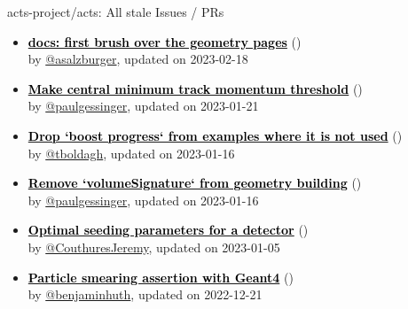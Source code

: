 \begin{frame}[allowframebreaks]{ acts-project/acts: All stale Issues / PRs}
\begin{itemize}
    \item\propen\prwip\prstale\textbf{\href{https://github.com/acts-project/acts/pull/1395}{\textcolor{black}{docs: first brush over the geometry pages}}}
    (\href{https://github.com/acts-project/acts/pull/1395}{}) \\
    by \href{https://github.com/asalzburger}{@asalzburger}, updated on 2023-02-18

    \item\iss\prstale\textbf{\href{https://github.com/acts-project/acts/issues/1761}{\textcolor{black}{Make central minimum track momentum threshold}}}
    (\href{https://github.com/acts-project/acts/issues/1761}{}) \\
    by \href{https://github.com/paulgessinger}{@paulgessinger}, updated on 2023-01-21

    \item\iss\prstale\textbf{\href{https://github.com/acts-project/acts/issues/1736}{\textcolor{black}{Drop `boost progress` from examples where it is not used}}}
    (\href{https://github.com/acts-project/acts/issues/1736}{}) \\
    by \href{https://github.com/tboldagh}{@tboldagh}, updated on 2023-01-16

    \item\iss\prstale\textbf{\href{https://github.com/acts-project/acts/issues/1731}{\textcolor{black}{Remove `volumeSignature` from geometry building}}}
    (\href{https://github.com/acts-project/acts/issues/1731}{}) \\
    by \href{https://github.com/paulgessinger}{@paulgessinger}, updated on 2023-01-16

    \item\iss\prstale\textbf{\href{https://github.com/acts-project/acts/issues/1699}{\textcolor{black}{Optimal seeding parameters for a detector}}}
    (\href{https://github.com/acts-project/acts/issues/1699}{}) \\
    by \href{https://github.com/CouthuresJeremy}{@CouthuresJeremy}, updated on 2023-01-05

    \item\iss\prstale\textbf{\href{https://github.com/acts-project/acts/issues/1603}{\textcolor{black}{Particle smearing assertion with Geant4}}}
    (\href{https://github.com/acts-project/acts/issues/1603}{}) \\
    by \href{https://github.com/benjaminhuth}{@benjaminhuth}, updated on 2022-12-21


\end{itemize}
\end{frame}
